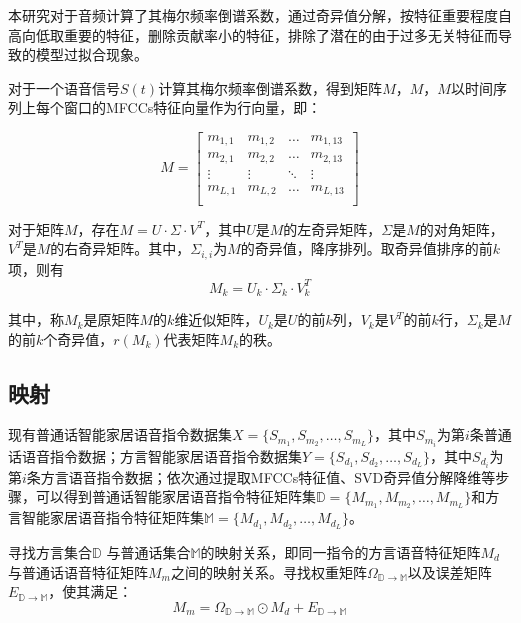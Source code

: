 \documentclass[lang=cn,cite=super]{elegantpaper}
\begin{document}
本研究对于音频计算了其梅尔频率倒谱系数，通过奇异值分解，按特征重要程度自高向低取重要的特征，删除贡献率小的特征，排除了潜在的由于过多无关特征而导致的模型过拟合现象。

对于一个语音信号$S(t)$计算其梅尔频率倒谱系数，得到矩阵$M$，$M$，$M$以时间序列上每个窗口的MFCCs特征向量作为行向量，即：

\begin{equation}
    M = 
    \begin{bmatrix}
        m_{1,1} & m_{1,2} & \ldots & m_{1,13} \\
        m_{2,1} & m_{2,2} & \ldots & m_{2,13} \\
        \vdots & \vdots & \ddots & \vdots \\
        m_{L,1} & m_{L,2} & \ldots & m_{L,13}\\
    \end{bmatrix}
\end{equation}

对于矩阵$M$，存在$M = U \cdot \Sigma \cdot V^T$，其中$U$是$M$的左奇异矩阵，$\Sigma$是$M$的对角矩阵，$V^T$是$M$的右奇异矩阵。其中，$\Sigma_{i,i}$为$M$的奇异值，降序排列。取奇异值排序的前$k$项，则有
\begin{equation}
    M_k = U_k \cdot \Sigma_k \cdot V^T_k
\end{equation}

其中，称$M_k$是原矩阵$M$的$k$维近似矩阵，$U_k$是$U$的前$k$列，$V_k$是$V^T$的前$k$行，$\Sigma_k$是$M$的前$k$个奇异值，$r(M_k)$代表矩阵$M_k$的秩。

\subsection{映射}
现有普通话智能家居语音指令数据集$X=\{S_{m_1}, S_{m_2}, \ldots, S_{m_L}\}$，其中$S_{m_i}$为第$i$条普通话语音指令数据；方言智能家居语音指令数据集$Y=\{S_{d_1}, S_{d_2}, \ldots, S_{d_L}\}$，其中$S_{d_i}$为第$i$条方言语音指令数据；依次通过提取MFCCs特征值、SVD奇异值分解降维等步骤，可以得到普通话智能家居语音指令特征矩阵集$\mathbb{D} = \{ M_{m_1}, M_{m_2}, \ldots, M_{m_L}\}$和方言智能家居语音指令特征矩阵集$\mathbb{M} = \{ M_{d_1}, M_{d_2}, \ldots, M_{d_L}\}$。

寻找方言集合$\mathbb{D}$ 与普通话集合$\mathbb{M}$的映射关系，即同一指令的方言语音特征矩阵$M_d$与普通话语音特征矩阵$M_m$之间的映射关系。寻找权重矩阵$\Omega_{\mathbb{D}\rightarrow \mathbb{M}}$以及误差矩阵$E_{\mathbb{D}\rightarrow \mathbb{M}}$，使其满足：
\begin{equation}
    M_m = \Omega_{\mathbb{D}\rightarrow  \mathbb{M}} \odot M_d + E_{\mathbb{D}\rightarrow \mathbb {M}}
\end{equation}
\end{document}
